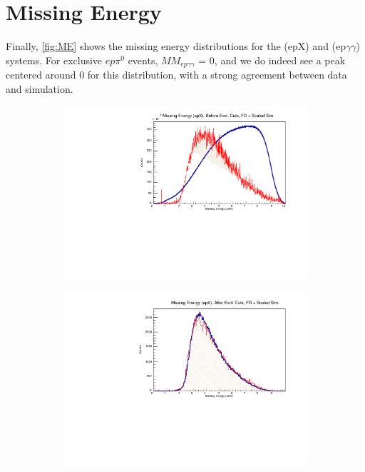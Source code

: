     \clearpage
    
    
    \section{Missing Energy}
    Finally, \ref{fig:ME} shows the missing energy distributions for the (epX) and (ep$\gamma \gamma$) systems. For exclusive $ep\pi^0$ events, $MM_{ep\gamma\gamma}$ = 0, and we do indeed see a peak centered around 0 for this distribution, with a strong agreement between data and simulation.

    \begin{figure}[!htb]
        \centering
        \begin{subfigure}{.5\textwidth}
            \centering
            \includegraphics[width=1\textwidth]{figures/Simulation/exclusivity/hist_missing_energy_epx_prexcut_fd_Double.pdf}
        \end{subfigure}%
        \begin{subfigure}{.5\textwidth}
            \centering
            \includegraphics[width=1\textwidth]{figures/Simulation/exclusivity/hist_missing_energy_epx_excut_fd_Double.pdf}

\end{subfigure}
\end{figure}
